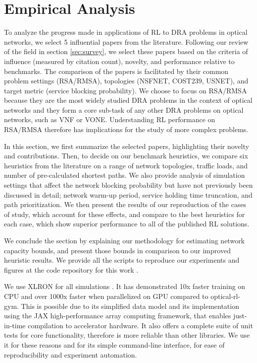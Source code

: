 \section{Empirical Analysis}
\label{sec:empirical_analysis}

To analyze the progress made in applications of RL to DRA problems in optical networks, we select 5 influential papers from the literature. Following our review of the field in section \ref{sec:survey}, we select these papers based on the criteria of influence (measured by citation count), novelty, and performance relative to benchmarks. The comparison of the papers is facilitated by their common problem settings (RSA/RMSA), topologies (NSFNET, COST239, USNET), and target metric (service blocking probability). We choose to focus on RSA/RMSA because they are the most widely studied DRA problems in the context of optical networks and they form a core sub-task of any other DRA problems on optical networks, such as VNF or VONE. Understanding RL performance on RSA/RMSA therefore has implications for the study of more complex problems.

In this section, we first summarize the selected papers, highlighting their novelty and contributions. Then, to decide on our benchmark heuristics, we compare six heuristics from the literature on a range of network topologies, traffic loads, and number of pre-calculated shortest paths.  We also provide analysis of simulation settings that affect the network blocking probability but have not previously been discussed in detail; network warm-up period, service holding time truncation, and path prioritization. We then present the results of our reproduction of the cases of study, which account for these effects, and compare to the best heuristics for each case, which show superior performance to all of the published RL solutions.

We conclude the section by explaining our methodology for estimating network capacity bounds, and present those bounds in comparison to our improved heuristic results. We provide all the scripts to reproduce our experiments and figures at the code repository for this work \cite{michael_doherty_micdohxlron_2024}.

We use XLRON for all simulations \cite{doherty_xlron_2023}. It has demonstrated 10x faster training on CPU and over 1000x faster when parallelized on GPU compared to optical-rl-gym. This is possible due to its simplified data model and its implementation using the JAX high-performance array computing framework, that enables just-in-time compilation to accelerator hardware. It also offers a complete suite of unit tests for core functionality, therefore is more reliable than other libraries. We use it for these reasons and for its simple command-line interface, for ease of reproducibility and experiment automation.











